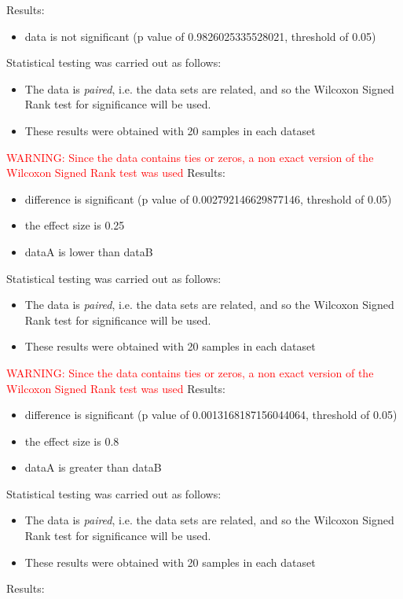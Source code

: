 \documentclass[]{article}
\begin{document}
Results:
\begin{itemize}
\item{data is not significant (p value of 0.9826025335528021, threshold of 0.05)}
\end{itemize}Statistical testing was carried out as follows: \begin{itemize}
\item{The data is \textit{paired}, i.e. the data sets are related, and so the Wilcoxon Signed Rank test for significance will be used.}
\item{These results were obtained with 20 samples in each dataset}
\end{itemize}
\textcolor{Red}{WARNING: Since the data contains ties or zeros, a non exact version of the Wilcoxon Signed Rank test was used
}
Results:
\begin{itemize}
\item{difference is significant (p value of 0.002792146629877146, threshold of 0.05)}
\item{the effect size is 0.25}
\item{dataA is lower than dataB}
\end{itemize}Statistical testing was carried out as follows: \begin{itemize}
\item{The data is \textit{paired}, i.e. the data sets are related, and so the Wilcoxon Signed Rank test for significance will be used.}
\item{These results were obtained with 20 samples in each dataset}
\end{itemize}
\textcolor{Red}{WARNING: Since the data contains ties or zeros, a non exact version of the Wilcoxon Signed Rank test was used
}
Results:
\begin{itemize}
\item{difference is significant (p value of 0.0013168187156044064, threshold of 0.05)}
\item{the effect size is 0.8}
\item{dataA is greater than dataB}
\end{itemize}Statistical testing was carried out as follows: \begin{itemize}
\item{The data is \textit{paired}, i.e. the data sets are related, and so the Wilcoxon Signed Rank test for significance will be used.}
\item{These results were obtained with 20 samples in each dataset}
\end{itemize}Results:
\end{document}
